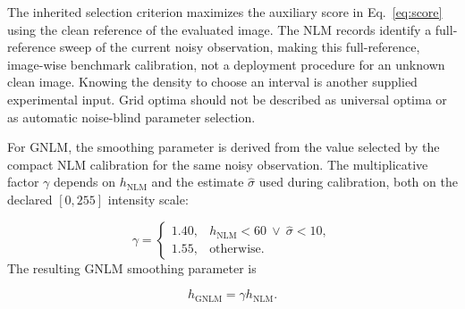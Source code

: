 \documentclass[pdflatex,iicol,sn-mathphys-num]{sn-jnl}
\newif\ifshowportuguese
\newcommand{\pt}[1]{\ifshowportuguese\par\begingroup\small\color{blue!55!black}\noindent\textbf{PT: }#1\par\endgroup\fi}
\begin{document}
The inherited selection criterion maximizes the auxiliary score in Eq.~\eqref{eq:score} using the clean reference of the evaluated image. The NLM records identify a full-reference sweep of the current noisy observation, making this full-reference, image-wise benchmark calibration, not a deployment procedure for an unknown clean image. Knowing the density to choose an interval is another supplied experimental input. Grid optima should not be described as universal optima or as automatic noise-blind parameter selection.
\pt{O critério de seleção herdado maximiza o score auxiliar da Eq.~\eqref{eq:score} usando a referência limpa da própria imagem avaliada. Os registros NLM identificam uma busca com referência completa na observação ruidosa atual, caracterizando calibração de benchmark por imagem com referência completa, não um procedimento de aplicação quando a imagem limpa é desconhecida. Conhecer a densidade para escolher um intervalo é outra informação experimental fornecida. Ótimos da grade não devem ser descritos como ótimos universais nem como seleção automática de parâmetros cega ao ruído.}

For GNLM, the smoothing parameter is derived from the value selected by the compact NLM calibration for the same noisy observation. The multiplicative factor $\gamma$ depends on $h_{\mathrm{NLM}}$ and the estimate $\hat{\sigma}$ used during calibration, both on the declared $[0,255]$ intensity scale:
\pt{Para o GNLM, o parâmetro de suavização é derivado do valor selecionado pela calibração do NLM compacto para a mesma observação ruidosa. O fator multiplicativo $\gamma$ depende de $h_{\mathrm{NLM}}$ e da estimativa $\hat{\sigma}$ usada durante a calibração, ambos na escala declarada de intensidade $[0,255]$:}
\begin{equation}
\gamma=\begin{cases}
1.40, & h_{\mathrm{NLM}}<60\ \lor\ \hat{\sigma}<10,\\
1.55, & \text{otherwise}.
\end{cases}
\label{eq:gnlm_gamma}
\end{equation}
The resulting GNLM smoothing parameter is
\pt{O parâmetro de suavização resultante do GNLM é}
\begin{equation}
h_{\mathrm{GNLM}}=\gamma h_{\mathrm{NLM}}.
\label{eq:gnlm_smoothing_transfer}
\end{equation}
\end{document}
